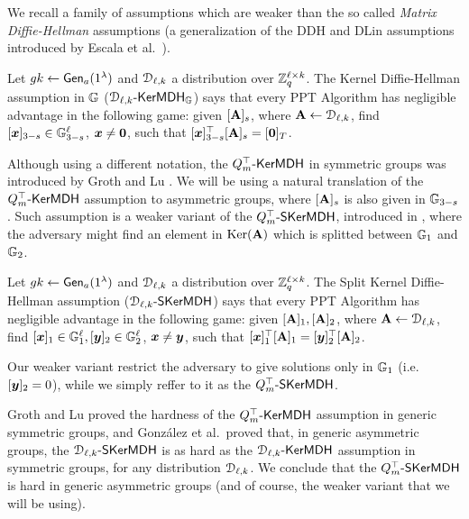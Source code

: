 We recall a family of assumptions which are weaker than the so called \emph{Matrix Diffie-Hellman} assumptions (a generalization of the DDH and DLin assumptions introduced by Escala et al.~\cite{C:EHKRV13}).
\begin{definition} Let  ${gk} 
\gets\mathsf{Gen}_a(1^\lambda)$ and $\mathcal{D}_{\ell,k}$ a distribution over $\mathbb{Z}_q^{\ell\times k}$.
The Kernel Diffie-Hellman assumption in $\mathbb{G}$ ($\mathcal{D}_{\ell,k}\mbox{-}\mathsf{KerMDH}_{\mathbb{G}}$) says that every PPT Algorithm has negligible advantage in the following  game: given $[\mathbf{{A}}]_s$, where $\mathbf{{A}} \gets \mathcal{D}_{\ell,k}$, find $[{\boldsymbol{x}}]_{3-s} \in \mathbb{G}^{\ell}_{3-s}$, ${\boldsymbol{x}} \neq {\boldsymbol{0}}$, such that 
$[{\boldsymbol{x}}]_{3-s}^{\top}[\mathbf{{A}}]_s=[{\boldsymbol{0}}]_T$. 
\end{definition}
Although using a different notation, the $Q_m^\top\mbox{-}\mathsf{KerMDH}$ in symmetric groups was introduced by Groth and Lu \cite{AC:GroLu07}.
We will be using a natural translation of the $Q_m^\top\mbox{-}\mathsf{KerMDH}$ assumption to asymmetric groups, where  $[\mathbf{{A}}]_s$ is also given in $\mathbb{G}_{3-s}$.  Such assumption is a weaker variant of the $Q_m^\top\mbox{-}\mathsf{SKerMDH}$, introduced in \cite{AC:GonHevRaf15}, where the adversary might find an element in $\mathrm{Ker}(\mathbf{{A}})$ which is splitted between $\mathbb{G}_1$ and $\mathbb{G}_2$.

\begin{definition} Let  ${gk} 
\gets\mathsf{Gen}_a(1^\lambda)$ and $\mathcal{D}_{\ell,k}$ a distribution over $\mathbb{Z}_q^{\ell\times k}$.
The Split Kernel Diffie-Hellman assumption ($\mathcal{D}_{\ell,k}\mbox{-}\mathsf{SKerMDH}$) says that every PPT Algorithm has negligible advantage in the following  game: given $[\mathbf{{A}}]_1,[\mathbf{{A}}]_2$, where $\mathbf{{A}} \gets \mathcal{D}_{\ell,k}$, find $[{\boldsymbol{x}}]_1\in\mathbb{G}_1^\ell,[{\boldsymbol{y}}]_2 \in \mathbb{G}^{\ell}_{2}$, ${\boldsymbol{x}}\neq{\boldsymbol{y}}$, such that 
$[{\boldsymbol{x}}]_{1}^{\top}[\mathbf{{A}}]_1=[{\boldsymbol{y}}]_2^\top[\mathbf{{A}}]_2$. 
\end{definition}
 Our weaker variant restrict the adversary to give solutions only in $\mathbb{G}_1$ (i.e.~$[{\boldsymbol{y}}]_2=0$), while we simply reffer to it as the $Q_m^\top\mbox{-}\mathsf{SKerMDH}$.

Groth and Lu proved the hardness of the $Q_m^\top\mbox{-}\mathsf{KerMDH}$ assumption in generic symmetric groups, and Gonz\'alez et al.~proved that, in generic asymmetric groups, the $\mathcal{D}_{\ell,k}\mbox{-}\mathsf{SKerMDH}$ is as hard as the $\mathcal{D}_{\ell,k}\mbox{-}\mathsf{KerMDH}$ assumption in symmetric groups, for any distribution $\mathcal{D}_{\ell,k}$. We conclude that the $Q_m^\top\mbox{-}\mathsf{SKerMDH}$ is hard in generic asymmetric groups (and of course, the weaker variant that we will be using).